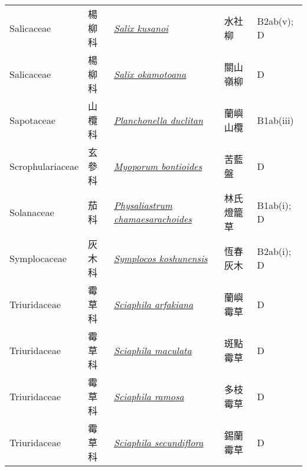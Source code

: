 {\begin{longtable}{p{2.5cm}p{2.5cm}p{4.5cm}p{2.5cm}p{3cm}}
    Salicaceae & 楊柳科 & \href{http://www.theplantlist.org/tpl1.1/search?q=Salix+kusanoi}{\textit{Salix kusanoi} } & 水社柳 & B2ab(v); D \index{Salix@\textit{Salix}!kusanoi@\textit{kusanoi}}  \index{水社柳} \\
    Salicaceae & 楊柳科 & \href{http://www.theplantlist.org/tpl1.1/search?q=Salix+okamotoana}{\textit{Salix okamotoana} } & 關山嶺柳 & D \index{Salix@\textit{Salix}!okamotoana@\textit{okamotoana}}  \index{關山嶺柳} \\
    Sapotaceae & 山欖科 & \href{http://www.theplantlist.org/tpl1.1/search?q=Planchonella+duclitan}{\textit{Planchonella duclitan} } & 蘭嶼山欖 & B1ab(iii) \index{Planchonella@\textit{Planchonella}!duclitan@\textit{duclitan}}  \index{蘭嶼山欖} \\
    Scrophulariaceae & 玄參科 & \href{http://www.theplantlist.org/tpl1.1/search?q=Myoporum+bontioides}{\textit{Myoporum bontioides} } & 苦藍盤 & D \index{Myoporum@\textit{Myoporum}!bontioides@\textit{bontioides}}  \index{苦藍盤} \\
    Solanaceae & 茄科 & \href{http://www.theplantlist.org/tpl1.1/search?q=Physaliastrum+chamaesarachoides}{\textit{Physaliastrum chamaesarachoides} } & 林氏燈籠草 & B1ab(i); D \index{Physaliastrum@\textit{Physaliastrum}!chamaesarachoides@\textit{chamaesarachoides}}  \index{林氏燈籠草} \\
    Symplocaceae & 灰木科 & \href{http://www.theplantlist.org/tpl1.1/search?q=Symplocos+koshunensis}{\textit{Symplocos koshunensis} } & 恆春灰木 & B2ab(i); D \index{Symplocos@\textit{Symplocos}!koshunensis@\textit{koshunensis}}  \index{恆春灰木} \\
    Triuridaceae & 霉草科 & \href{http://www.theplantlist.org/tpl1.1/search?q=Sciaphila+arfakiana}{\textit{Sciaphila arfakiana} } & 蘭嶼霉草 & D \index{Sciaphila@\textit{Sciaphila}!arfakiana@\textit{arfakiana}}  \index{蘭嶼霉草} \\
    Triuridaceae & 霉草科 & \href{http://www.theplantlist.org/tpl1.1/search?q=Sciaphila+maculata}{\textit{Sciaphila maculata} } & 斑點霉草 & D \index{Sciaphila@\textit{Sciaphila}!maculata@\textit{maculata}}  \index{斑點霉草} \\
    Triuridaceae & 霉草科 & \href{http://www.theplantlist.org/tpl1.1/search?q=Sciaphila+ramosa}{\textit{Sciaphila ramosa} } & 多枝霉草 & D \index{Sciaphila@\textit{Sciaphila}!ramosa@\textit{ramosa}}  \index{多枝霉草} \\
    Triuridaceae & 霉草科 & \href{http://www.theplantlist.org/tpl1.1/search?q=Sciaphila+secundiflora}{\textit{Sciaphila secundiflora} } & 錫蘭霉草 & D \index{Sciaphila@\textit{Sciaphila}!secundiflora@\textit{secundiflora}}  \index{錫蘭霉草} \\

\end{longtable}}
